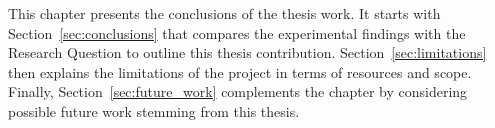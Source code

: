 This chapter presents the conclusions of the thesis work. It starts with Section~\ref{sec:conclusions} that compares the experimental findings with the Research Question to outline this thesis contribution. Section~\ref{sec:limitations} then explains the limitations of the project in terms of resources and scope. Finally, Section~\ref{sec:future_work} complements the chapter by considering possible future work stemming from this thesis.